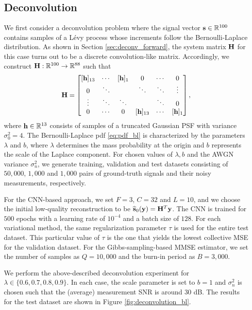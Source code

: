 \documentclass[journal]{IEEEtran}
\begin{document}
\subsection{Deconvolution}
We first consider a deconvolution problem where the signal vector ${\bf{s}} \in \mathbb{R}^{100}$ contains samples of a L\'{e}vy process whose increments follow the Bernoulli-Laplace distribution. As shown in Section \ref{sec:deconv_forward}, the system matrix ${\bf{H}}$ for this case turns out to be a discrete convolution-like matrix. Accordingly, we construct ${\bf{H}}: \mathbb{R}^{100} \rightarrow \mathbb{R}^{88}$ such that
\begin{equation}
    {\bf{H}} = \begin{bmatrix}
        [{\bf{h}}]_{13} & \cdots & [{\bf{h}}]_1 & 0  & \cdots & 0 \\
        0 & \ddots & & \ddots & \ddots & \vdots \\
        \vdots & \ddots & \ddots & & \ddots & 0 \\
        0 & \cdots & 0 & [{\bf{h}}]_{13} & \cdots & [{\bf{h}}]_1
        \end{bmatrix},
\end{equation}
where ${\bf{h}} \in \mathbb{R}^{13}$ consists of samples of a truncated Gaussian PSF with variance $\sigma_{0}^{2} = 4$. The Bernoulli-Laplace pdf \eqref{eq:pdf_bl} is characterized by the parameters $\lambda$ and $b$, where $\lambda$ determines the mass probability at the origin and $b$ represents the scale of the Laplace component. For chosen values of $\lambda, b$ and the AWGN variance $\sigma_n^{2}$, we generate training, validation and test datasets consisting of $50,000$, $1,000$ and $1,000$ pairs of ground-truth signals and their noisy measurements, respectively.

For the CNN-based approach, we set $F=3$, $C=32$ and $L=10$, and we choose the initial low-quality reconstruction to be $\widehat{{\bf{s}}}_{0}({\bf{y}}) = {\bf{H}}^{T} {\bf{y}}$. The CNN is trained for $500$ epochs with a learning rate of $10^{-4}$ and a batch size of $128$. For each variational method, the same regularization parameter $\tau$ is used for the entire test dataset. This particular value of $\tau$ is the one that yields the lowest collective MSE for the validation dataset. For the Gibbs-sampling-based MMSE estimator, we set the number of samples as $Q=10,000$ and the burn-in period as $B=3,000$.

We perform the above-described deconvolution experiment for $\lambda \in \{ 0.6, 0.7, 0.8, 0.9 \}$. In each case, the scale parameter is set to $b=1$ and $\sigma_n^{2}$ is chosen such that the (average) measurement SNR is around $30$ dB. The results for the test dataset are shown in Figure \ref{fig:deconvolution_bl}.
\end{document}
